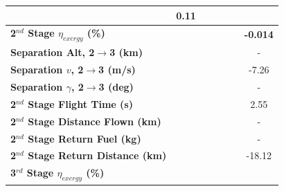 \begin{table}[ht]
\begin{tabular}{l c c c c c c}
	&0.11
	\\
	\hline 
	\textbf{2$^{nd}$ Stage $\eta_{exergy}$ (\%)}
	& \textbf{\secondExergyEffmSPARTANNinety}
	& \textbf{\secondExergyEffmSPARTANNinetyFive}
	& \textbf{\secondExergyEffmSPARTANStandard}
	& \textbf{\secondExergyEffmSPARTANOneHundredFive}
	& \textbf{\secondExergyEffmSPARTANOneHundredTen}
	& \textbf{-0.014}
	\\
	\textbf{Separation Alt, 2$\rightarrow$3 (km)}
	& \secondthirdSeparationAltmSPARTANNinety
	& \secondthirdSeparationAltmSPARTANNinetyFive
	& \secondthirdSeparationAltmSPARTANStandard
	& \secondthirdSeparationAltmSPARTANOneHundredFive
	& \secondthirdSeparationAltmSPARTANOneHundredTen
	& -
	\\
	\textbf{Separation $v$, 2$\rightarrow$3 (m/s)}
	& \secondthirdSeparationvmSPARTANNinety
	& \secondthirdSeparationvmSPARTANNinetyFive
	& \secondthirdSeparationvmSPARTANStandard
	& \secondthirdSeparationvmSPARTANOneHundredFive
	& \secondthirdSeparationvmSPARTANOneHundredTen
	&-7.26
	\\
	\textbf{Separation $\gamma$, 2$\rightarrow$3 (deg)}
	& \secondthirdSeparationgammamSPARTANNinety
	& \secondthirdSeparationgammamSPARTANNinetyFive
	& \secondthirdSeparationgammamSPARTANStandard
	& \secondthirdSeparationgammamSPARTANOneHundredFive
	& \secondthirdSeparationgammamSPARTANOneHundredTen
	& -
	\\
	\textbf{2$^{nd}$ Stage Flight Time (s)}
	& \secondFlightTimemSPARTANNinety
	& \secondFlightTimemSPARTANNinetyFive
	& \secondFlightTimemSPARTANStandard
	& \secondFlightTimemSPARTANOneHundredFive
	& \secondFlightTimemSPARTANOneHundredTen
	&2.55
	\\
	\textbf{2$^{nd}$ Stage Distance Flown (km)}
	& \SecondDistmSPARTANNinety
	& \SecondDistmSPARTANNinetyFive
	& \SecondDistmSPARTANStandard
	& \SecondDistmSPARTANOneHundredFive
	& \SecondDistmSPARTANOneHundredTen
	& -
	\\
	\textbf{2$^{nd}$ Stage Return Fuel (kg)}
	& \returnFuelmSPARTANNinety
	& \returnFuelmSPARTANNinetyFive
	& \returnFuelmSPARTANStandard
	& \returnFuelmSPARTANOneHundredFive
	& \returnFuelmSPARTANOneHundredTen
	& -
	\\
	\textbf{2$^{nd}$ Stage Return Distance (km)}
	& \returnDistmSPARTANNinety
	& \returnDistmSPARTANNinetyFive
	& \returnDistmSPARTANStandard
	& \returnDistmSPARTANOneHundredFive
	& \returnDistmSPARTANOneHundredTen
	&-18.12
	\\
	\hline 
	\textbf{3$^{rd}$ Stage $\eta_{exergy}$ (\%)}
	& \textbf{\thirddExergyEffmSPARTANNinety}
	& \textbf{\thirddExergyEffmSPARTANNinetyFive}

\end{tabular}
\end{table}
